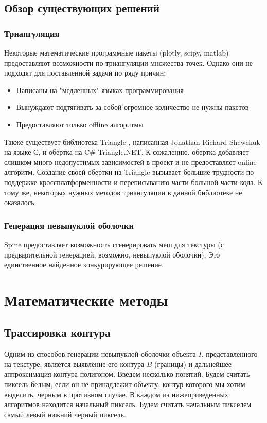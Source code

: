 \documentclass{fefu}
\begin{document}
\subsection{Обзор существующих решений}
\subsubsection{Триангуляция}
Некоторые математические программные пакеты (plotly, scipy, matlab) предоставляют возможности по триангуляции 
множества точек. Однако они не подходят для поставленной задачи по ряду причин:
\begin{itemize}
    \item Написаны на "медленных" языках программирования
    \item Вынуждают подтягивать за собой огромное количество не нужны пакетов
    \item Предоставляют только offline алгоритмы
\end{itemize}
Также существует библиотека Triangle \cite{TriangleSite}, написанная Jonathan Richard Shewchuk на языке С, и
обертка на C\# Triangle.NET. К сожалению, обертка добавляет слишком много недопустимых зависимостей в проект и не 
предоставляет online алгоритм. Создание своей обертки на Triangle вызывает большие трудности по поддержке 
кроссплатформенности и переписыванию части большой части кода. К тому же, некоторых нужных методов триангуляции в 
данной библиотеке не оказалось.
\subsubsection{Генерация невыпуклой оболочки}
Spine предоставляет возможность сгенерировать меш для текстуры (с предварительной генерацией, возможно, невыпуклой оболочки). 
Это единственное найденное конкурирующее решение.
\section{Математические методы}
\subsection{Трассировка контура}
Одним из способов генерации невыпуклой оболочки объекта $I$, представленного на текстуре, является выявление
его контура $B$ (границы) и дальнейшее аппроксимация контура полигоном. Введем несколько понятий. Будем считать 
пиксель белым, если он не принадлежит объекту, контур которого мы хотим выделить, черным в противном случае. 
В каждом из нижеприведенных алгоритмов находится начальный пиксель. Будем считать начальным пикселем самый левый 
нижний черный пиксель.
\end{document}

